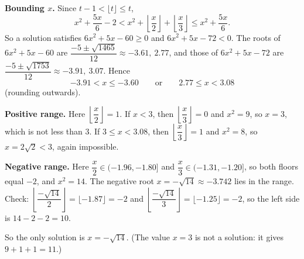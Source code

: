 \textbf{Bounding $x$.} Since $t-1<\lfloor t\rfloor\le t$,
\[x^2+\dfrac{5x}{6}-2<x^2+\left\lfloor\dfrac {x}{2}\right\rfloor+\left\lfloor\dfrac {x}{3}\right\rfloor\le x^2+\dfrac{5x}{6}.\]
So a solution satisfies $6x^2+5x-60\ge0$ and $6x^2+5x-72<0$. The roots of $6x^2+5x-60$ are $\dfrac{-5\pm\sqrt{1465}}{12}\approx-3.61,\ 2.77$, and those of $6x^2+5x-72$ are $\dfrac{-5\pm\sqrt{1753}}{12}\approx-3.91,\ 3.07$. Hence
\[-3.91<x\le-3.60\qquad\text{or}\qquad2.77\le x<3.08\]
(rounding outwards).

\textbf{Positive range.} Here $\left\lfloor\dfrac {x}{2}\right\rfloor=1$. If $x<3$, then $\left\lfloor\dfrac {x}{3}\right\rfloor=0$ and $x^2=9$, so $x=3$, which is not less than $3$. If $3\le x<3.08$, then $\left\lfloor\dfrac {x}{3}\right\rfloor=1$ and $x^2=8$, so $x=2\sqrt2<3$, again impossible.

\textbf{Negative range.} Here $\dfrac {x}{2}\in(-1.96,-1.80]$ and $\dfrac {x}{3}\in(-1.31,-1.20]$, so both floors equal $-2$, and $x^2=14$. The negative root $x=-\sqrt{14}\approx-3.742$ lies in the range. Check: $\left\lfloor\dfrac{-\sqrt{14}}{2}\right\rfloor=\lfloor-1.87\rfloor=-2$ and $\left\lfloor\dfrac{-\sqrt{14}}{3}\right\rfloor=\lfloor-1.25\rfloor=-2$, so the left side is $14-2-2=10$.

So the only solution is $\boxed{x=-\sqrt{14}}$. (The value $x=3$ is not a solution: it gives $9+1+1=11$.)
